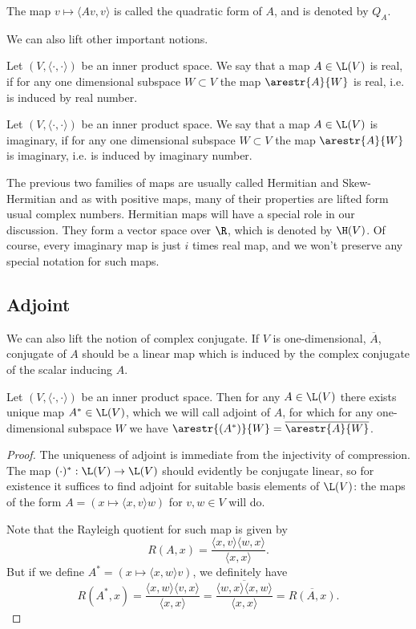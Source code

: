 The map $v \mapsto \langle A v, v \rangle$ is called the quadratic form of $A$, and is denoted by $Q_{A}$.

We can also lift other important notions.

\begin{maar}
	Let $(V, \langle \cdot, \cdot \rangle)$ be an inner product space. We say that a map $A \in \L(V)$ is real, if for any one dimensional subspace $W \subset V$ the map $\arestr{A}{W}$ is real, i.e. is induced by real number.
\end{maar}

\begin{maar}
	Let $(V, \langle \cdot, \cdot \rangle)$ be an inner product space. We say that a map $A \in \L(V)$ is imaginary, if for any one dimensional subspace $W \subset V$ the map $\arestr{A}{W}$ is imaginary, i.e. is induced by imaginary number.
\end{maar}

The previous two families of maps are usually called Hermitian and Skew-Hermitian and as with positive maps, many of their properties are lifted form usual complex numbers. Hermitian maps will have a special role in our discussion. They form a vector space over $\R$, which is denoted by $\H(V)$. Of course, every imaginary map is just $i$ times real map, and we won't preserve any special notation for such maps.

\subsection{Adjoint}

We can also lift the notion of complex conjugate. If $V$ is one-dimensional, $\overline{A}$, conjugate of $A$ should be a linear map which is induced by the complex conjugate of the scalar inducing $A$.

\begin{lause}
	Let $(V, \langle \cdot, \cdot \rangle)$ be an inner product space. Then for any $A \in \L(V)$ there exists unique map $A^{*} \in \L(V)$, which we will call adjoint of $A$, for which for any one-dimensional subspace $W$ we have $\arestr{(A^{*})}{W} = \overline{\arestr{A}{W}}$.
\end{lause}
\begin{proof}
	The uniqueness of adjoint is immediate from the injectivity of compression. The map $(\cdot)^{*} : \L(V) \to \L(V)$ should evidently be conjugate linear, so for existence it suffices to find adjoint for suitable basis elements of $\L(V)$: the maps of the form $A = (x \mapsto \langle x, v \rangle w)$ for $v, w \in V$ will do.

	Note that the Rayleigh quotient for such map is given by
	\[
		R(A, x) = \frac{\langle x, v \rangle \langle w, x \rangle}{\langle x, x \rangle}.
	\]
	But if we define $A^{*} = (x \mapsto \langle x, w \rangle v)$, we definitely have
	\[
		R(A^{*}, x) = \frac{\langle x, w \rangle \langle v, x \rangle}{\langle x, x \rangle} = \overline{\frac{\langle w, x \rangle \langle x, w \rangle}{\langle x, x \rangle}} = \overline{R(A, x)}.
	\]
\end{proof}

